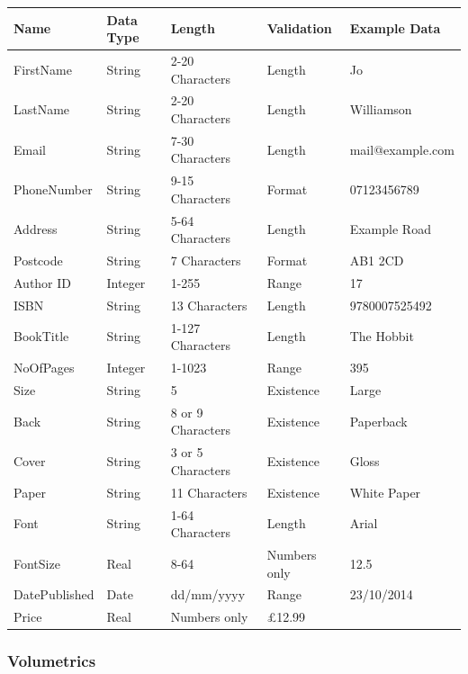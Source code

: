\begin{center}
\begin{tabular}{|p{2cm}|p{1cm}|p{2.5cm}|p{1.5cm}|p{3cm}|}
    \hline
    \textbf{Name} & \textbf{Data Type} & \textbf{Length} & \textbf{Validation} & \textbf{Example Data} \\ \hline
    FirstName & String & 2-20 Characters & Length & Jo  \\ \hline
    LastName & String & 2-20 Characters & Length & Williamson  \\ \hline
    Email & String & 7-30 Characters & Length & mail@example.com  \\ \hline
    PhoneNumber & String & 9-15 Characters & Format & 07123456789  \\ \hline
    Address & String & 5-64 Characters & Length & Example Road  \\ \hline
    Postcode & String & 7 Characters & Format & AB1 2CD  \\ \hline
    Author ID & Integer & 1-255 & Range & 17  \\ \hline
    ISBN & String & 13 Characters & Length & 9780007525492 \\ \hline
    BookTitle & String & 1-127 Characters & Length & The Hobbit  \\ \hline
    NoOfPages & Integer & 1-1023 & Range & 395  \\ \hline
    Size & String & 5 & Existence & Large \\ \hline
    Back & String & 8 or 9 Characters& Existence & Paperback  \\ \hline
    Cover & String & 3 or 5 Characters & Existence & Gloss \\ \hline
    Paper & String & 11 Characters & Existence & White Paper\\ \hline
    Font & String & 1-64 Characters & Length & Arial  \\ \hline
    FontSize & Real & 8-64 & Numbers only & 12.5  \\ \hline
    DatePublished & Date & dd/mm/yyyy & Range & 23/10/2014 \\ \hline
    Price & Real & Numbers only & £12.99 \\ \hline
    \hline
\end{tabular}
\end{center}

\subsubsection{Volumetrics}

